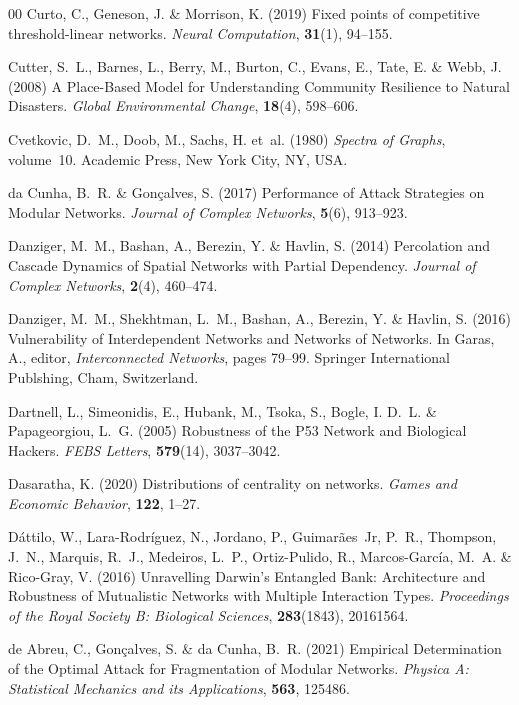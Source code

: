 \documentclass{comnet-mod}
\begin{document}
\begin{thebibliography}{00}
Curto, C., Geneson, J. {\&} Morrison, K. (2019)  Fixed points of competitive
  threshold-linear networks. {\em {Neural Computation}}, \textbf{31}(1),
  94--155.

Cutter, S.~L., Barnes, L., Berry, M., Burton, C., Evans, E., Tate, E. {\&}
  Webb, J. (2008)  {A Place-Based Model for Understanding Community Resilience
  to Natural Disasters}. {\em {Global Environmental Change}}, \textbf{18}(4),
  598--606.

Cvetkovic, D.~M., Doob, M., Sachs, H.  et~al. (1980) {\em {Spectra of Graphs}},
  volume~10.
{Academic Press}, {New York City, NY, USA}.

{da Cunha}, B.~R. {\&} Gon{\c c}alves, S. (2017)  {Performance of Attack
  Strategies on Modular Networks}. {\em {Journal of Complex Networks}},
  \textbf{5}(6), 913--923.

Danziger, M.~M., Bashan, A., Berezin, Y. {\&} Havlin, S. (2014)  {Percolation
  and Cascade Dynamics of Spatial Networks with Partial Dependency}. {\em
  {Journal of Complex Networks}}, \textbf{2}(4), 460--474.

Danziger, M.~M., Shekhtman, L.~M., Bashan, A., Berezin, Y. {\&} Havlin, S.
  (2016)  {Vulnerability of Interdependent Networks and Networks of Networks}.
  In Garas, A., editor, {\em {Interconnected Networks}}, pages 79--99.
  {Springer International Publshing}, Cham, Switzerland.

Dartnell, L., Simeonidis, E., Hubank, M., Tsoka, S., Bogle, I. D.~L. {\&}
  Papageorgiou, L.~G. (2005)  {Robustness of the P53 Network and Biological
  Hackers}. {\em {FEBS Letters}}, \textbf{579}(14), 3037--3042.

Dasaratha, K. (2020)  Distributions of centrality on networks. {\em {Games and
  Economic Behavior}}, \textbf{122}, 1--27.

D{\'a}ttilo, W., {Lara-Rodr{\'i}guez}, N., Jordano, P., Guimar{\~a}es~Jr,
  P.~R., Thompson, J.~N., Marquis, R.~J., Medeiros, L.~P., {Ortiz-Pulido}, R.,
  {Marcos-Garc{\'i}a}, M.~A. {\&} {Rico-Gray}, V. (2016)  {Unravelling
  {{Darwin}}'s Entangled Bank: {{Architecture}} and Robustness of Mutualistic
  Networks with Multiple Interaction Types}. {\em {Proceedings of the Royal
  Society B: Biological Sciences}}, \textbf{283}(1843), 20161564.

{de Abreu}, C., Gon{\c c}alves, S. {\&} {da Cunha}, B.~R. (2021)  {Empirical
  Determination of the Optimal Attack for Fragmentation of Modular Networks}.
  {\em {Physica A: Statistical Mechanics and its Applications}}, \textbf{563},
  125486.


\end{thebibliography}
\end{document}
